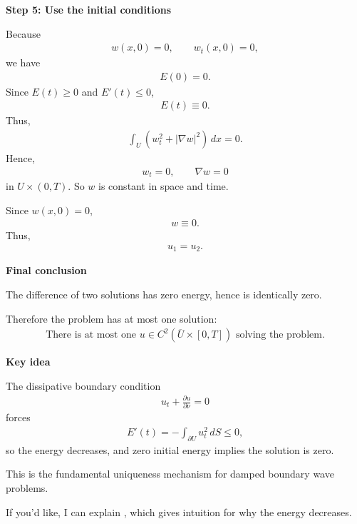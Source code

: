 \documentclass[12pt,a4paper]{report}
\begin{document}
\begin{description}
\item \textbf{Step 5: Use the initial conditions}

Because
\begin{align*}
w(x,0)=0,\qquad w_t(x,0)=0,
\end{align*}
we have
\begin{align*}
E(0)=0.
\end{align*}
Since $E(t)\ge 0$ and $E'(t)\le 0$,
\begin{align*}
E(t)\equiv 0.
\end{align*}
Thus,
\begin{align*}
\int_U \left(w_t^2+|\nabla w|^2\right)\,dx=0.
\end{align*}
Hence,
\begin{align*}
w_t=0,\qquad \nabla w=0
\end{align*}
in $U\times(0,T)$.
So $w$ is constant in space and time.

Since $w(x,0)=0$,
\begin{align*}
w\equiv 0.
\end{align*}
Thus,
\begin{align*}
u_1=u_2.
\end{align*}

\item \textbf{Final conclusion}

The difference of two solutions has zero energy, hence is identically zero.

Therefore the problem has at most one solution:
\begin{align*}
\boxed{\text{There is at most one }u\in C^2(\overline U\times[0,T])\text{ solving the problem.}}
\end{align*}

\item \textbf{Key idea}

The dissipative boundary condition
\begin{align*}
u_t+\frac{\partial u}{\partial \nu}=0
\end{align*}
forces
\begin{align*}
E'(t)=-\int_{\partial U}u_t^2\,dS\le 0,
\end{align*}
so the energy decreases, and zero initial energy implies the solution is zero.

This is the fundamental uniqueness mechanism for damped boundary wave problems.

\end{description}

If you'd like, I can explain , which gives intuition for why the energy decreases.
\end{document}
